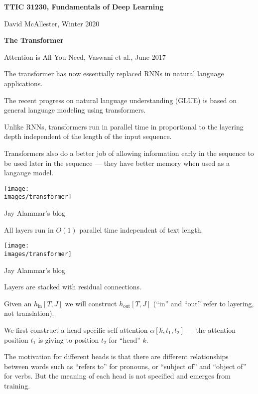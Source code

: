 





{\Huge
  \centerline{\bf TTIC 31230,  Fundamentals of Deep Learning}
  \vfill
  \centerline{David McAllester, Winter 2020}
  \vfill
  \centerline{\bf  The Transformer}
  \vfill
  \vfill


Attention is All You Need, Vaswani et al., June 2017

\vfill
The transformer has now essentially replaced RNNs in natural language applications.

\vfill
The recent progress on natural language understanding (GLUE) is based on general language modeling using transformers.


Unlike RNNs, transformers run in parallel time in proportional to the layering depth
independent of the length of the input sequence.

\vfill
Transformers also do a better job of allowing information early in the sequence to be used later in the sequence --- they have better memory when used as a langauge model.


\centerline{\texttt{[image: \\images/transformer]}}

{\huge
\centerline{Jay Alammar's blog}
}

All layers run in $O(1)$ parallel time independent of text length.


\centerline{\texttt{[image: \\images/transformer]}}

{\huge
\centerline{Jay Alammar's blog}
}

Layers are stacked with residual connections.


Given an $h_\mathrm{in}[T,J]$ we will construct $h_\mathrm{out}[T,J]$ (``in'' and ``out'' refer to layering, not translation).
\vfill

We first construct a head-specific self-attention $\alpha[k,t_1,t_2]$ --- the attention position
$t_1$ is giving to position $t_2$ for ``head'' $k$.

\vfill
The motivation for different heads is that there are different relationships between words such as ``refers to'' for pronouns,
or ``subject of'' and ``object of'' for verbs. But the meaning of each head is not specified and emerges from training.

}
